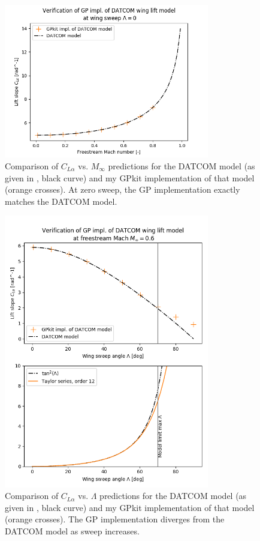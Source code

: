 \documentclass[12pt]{article}
\begin{document}
\begin{figure}[hbt!]
    \centering
    \includegraphics[width=0.8\textwidth]{figures/wing_lift_model_compare/GP_mach}
    \caption{\label{fig:wing_model_GP_mach} Comparison of $C_{L\alpha}$ vs. $M_\infty$ predictions for the DATCOM model (as given in \cite{Raymer2012}, black curve) and my GPkit implementation of that model (orange crosses). At zero sweep, the GP implementation exactly matches the DATCOM model.}
\end{figure}

\begin{figure}[hbt!]
    \centering
    \includegraphics[width=0.8\textwidth]{figures/wing_lift_model_compare/GP_sweep}
    \caption{\label{fig:wing_model_GP_sweep} Comparison of $C_{L\alpha}$ vs. $\Lambda$ predictions for the DATCOM model (as given in \cite{Raymer2012}, black curve) and my GPkit implementation of that model (orange crosses). The GP implementation diverges from the DATCOM model as sweep increases.}
\end{figure}
\end{document}
